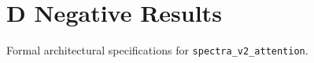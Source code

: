 \section{D Negative Results}

Formal architectural specifications for \texttt{spectra_v2_attention}.

